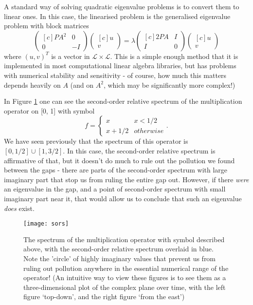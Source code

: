 \documentclass[../main.tex]{subfiles}
\begin{document}
A standard way of solving quadratic eigenvalue problems is to convert them to linear ones. In
this case, the linearised problem is the generalised eigenvalue problem with block matrices
  $$
  \begin{pmatrix*}[c]
    PA^2 &  0 \\
    0    & -I
  \end{pmatrix*}
  \begin{pmatrix*}[c]
    u \\ v
  \end{pmatrix*}
  =
  \lambda
  \begin{pmatrix*}[c]
    2PA & I \\
    I   & 0
  \end{pmatrix*}
  \begin{pmatrix*}[c]
    u \\ v
  \end{pmatrix*}
  $$
where $(u, v)^T$ is a vector in $\mathcal{L} \times \mathcal{L}$. This is a simple enough method that
it is implemented in most computational linear algebra libraries, but has problems with numerical
stability and sensitivity \cite{higham2008scaling} - of course, how much this matters depends
heavily on $A$ (and on $A^2$, which may be significantly more complex!)

In Figure \ref{fig:sors-mult} one can see the second-order relative spectrum of the multiplication
operator on [0, 1] with symbol
$$f =
\begin{cases}
  x & x < 1/2 \\
  x + 1/2 & otherwise
\end{cases}.
$$
We have seen previously that the spectrum of this operator is $[0, 1/2] \cup [1, 3/2]$. In this case,
the second-order relative spectrum is affirmative of that, but it doesn't do much to rule out the
pollution we found between the gaps - there are parts of the second-order spectrum with large imaginary
part that stop us from ruling the entire gap out. However, if there \emph{were} an eigenvalue in the gap,
and a point of second-order spectrum with small imaginary part near it, that would allow us to conclude that
such an eigenvalue \emph{does} exist.

\begin{figure}[h!]
\centering
  \texttt{[image: sors]}
  \caption{The spectrum of the multiplication operator with symbol described above, with the second-order
  relative spectrum overlaid in blue. Note the 'circle' of highly imaginary values that prevent us from
  ruling out pollution anywhere in the essential numerical range of the operator!
  (An intuitive way to
	view these figures is to see them as a three-dimensional plot
	of the complex plane over time, with the left figure `top-down',
	and the right figure `from the east')}
  \label{fig:sors-mult}
\end{figure}
\clearpage
\end{document}
